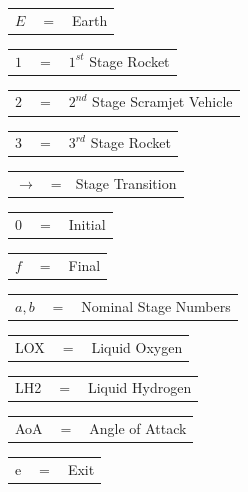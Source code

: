 \documentclass[journal]{new-aiaa}
\begin{document}
\newline
\begin{tabular}{p{1.2cm}p{1cm}p{5cm}}
	$E$ & $=$ & Earth\\

\end{tabular} 
\begin{tabular}{p{1.2cm}p{1cm}p{5cm}}
$1$ & $=$ & $1^{st}$ Stage Rocket\\
\end{tabular} 
\begin{tabular}{p{1.2cm}p{1cm}p{5cm}}
	$2$ & $=$ & $2^{nd}$ Stage Scramjet Vehicle\\
		\end{tabular} 
		\begin{tabular}{p{1.2cm}p{1cm}p{5cm}}
	$3$ & $=$ & $3^{rd}$ Stage Rocket\\
		\end{tabular} 
		\begin{tabular}{p{1.2cm}p{1cm}p{5cm}}
	$\rightarrow$ & = & Stage Transition\\
		\end{tabular} 
				\begin{tabular}{p{1.2cm}p{1cm}p{5cm}}
					$0$ & $=$ & Initial\\
				\end{tabular} 
		\begin{tabular}{p{1.2cm}p{1cm}p{5cm}}
	$f$ & $=$ & Final\\
\end{tabular} 
\begin{tabular}{p{1.2cm}p{1cm}p{5cm}}
	$a,b$ & $=$ & Nominal Stage Numbers\\
\end{tabular} 
\begin{tabular}{p{1.2cm}p{1cm}p{5cm}}
	LOX & $=$ & Liquid Oxygen\\
\end{tabular} 
\begin{tabular}{p{1.2cm}p{1cm}p{5cm}}
	LH2 & $=$ & Liquid Hydrogen\\

\end{tabular} 
\begin{tabular}{p{1.2cm}p{1cm}p{5cm}}
	AoA & $=$ & Angle of Attack\\

\end{tabular} 
\begin{tabular}{p{1.2cm}p{1cm}p{5cm}}
	e & $=$ & Exit\\
\end{tabular} 
\end{document}
